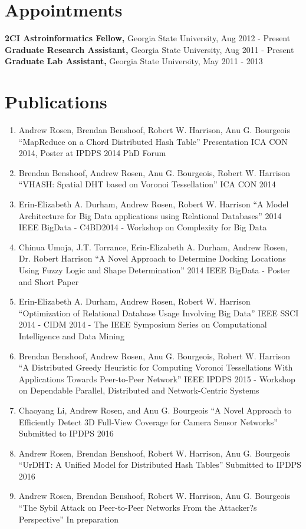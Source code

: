 \documentclass[12pt,a4paper]{article}
\begin{document}
\section*{Appointments}
{\bf 2CI Astroinformatics Fellow,} Georgia State University, Aug 2012 - Present\\
{\bf Graduate Research Assistant,} Georgia State University, Aug 2011 - Present\\
{\bf Graduate Lab Assistant,} Georgia State University, May 2011 - 2013

\section*{Publications}
\begin{enumerate}
	\item Andrew Rosen, Brendan Benshoof, Robert W. Harrison, Anu G. Bourgeois
	``MapReduce on a Chord Distributed Hash Table''
	Presentation ICA CON 2014, Poster at IPDPS 2014 PhD Forum
	\item Brendan Benshoof, Andrew Rosen, Anu G. Bourgeois, Robert W. Harrison
	``VHASH: Spatial DHT based on Voronoi Tessellation''
	ICA CON 2014
	\item  Erin-Elizabeth A. Durham, Andrew Rosen, Robert W. Harrison
	``A Model Architecture for Big Data applications using Relational Databases''
	2014 IEEE BigData - C4BD2014 - Workshop on Complexity for Big Data
	\item Chinua Umoja, J.T. Torrance, Erin-Elizabeth A. Durham, Andrew Rosen, Dr. Robert Harrison
	``A Novel Approach to Determine Docking Locations Using Fuzzy Logic and Shape Determination''
	2014 IEEE BigData - Poster and Short Paper
	\item  Erin-Elizabeth A. Durham, Andrew Rosen, Robert W. Harrison
	``Optimization of Relational Database Usage Involving Big Data''
	IEEE SSCI 2014 - CIDM 2014 - The IEEE Symposium Series on Computational Intelligence and Data Mining
	\item Brendan Benshoof, Andrew Rosen, Anu G. Bourgeois, Robert W. Harrison
	``A Distributed Greedy Heuristic for Computing Voronoi Tessellations With Applications Towards Peer-to-Peer Network''
	IEEE IPDPS 2015 - Workshop on Dependable Parallel, Distributed and Network-Centric Systems
	\item Chaoyang Li, Andrew Rosen,  and Anu G. Bourgeois
	``A Novel Approach to Efficiently Detect 3D Full-View Coverage for Camera Sensor Networks''
	Submitted to IPDPS 2016 
	\item Andrew Rosen, Brendan Benshoof, Robert W. Harrison, Anu G. Bourgeois
	``UrDHT: A Unified Model for Distributed Hash Tables''
	Submitted to IPDPS 2016
	\item Andrew Rosen, Brendan Benshoof, Robert W. Harrison, Anu G. Bourgeois
	``The Sybil Attack on Peer-to-Peer Networks From the Attacker?s Perspective''
	In preparation
	
\end{enumerate}
\end{document}
